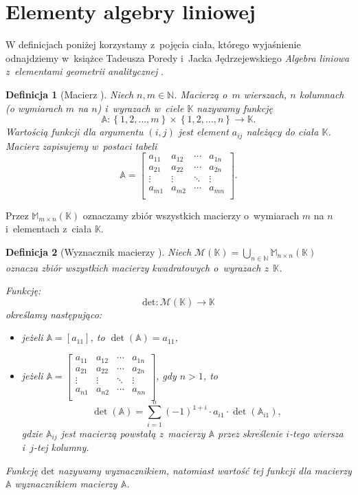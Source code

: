 \documentclass[12pt,a4paper]{report}
\newtheorem{df}{Definicja}[chapter]
\newcommand{\set}[1]{\left\lbrace {#1} \right\rbrace}
\newcommand{\setK}{\mathbb{K}}
\newcommand{\setN}{\mathbb{N}}
\newcommand{\wyznacznik}[1]{\operatorname{det}\left({#1} \right)}
\begin{document}
\section{Elementy algebry liniowej}

W definicjach poniżej korzystamy z~pojęcia ciała, którego wyjaśnienie odnajdziemy w~książce Tadeusza Poredy i~Jacka Jędrzejewskiego \textit{Algebra liniowa z~elementami geometrii analitycznej} {\citep[Sec 4.4]{alzega}}.

\begin{df}[Macierz {\citep[Sec 8.1 Def. 8.1]{alzega}}]
Niech $n,m \in \setN$. Macierzą o~$m$ wierszach, $n$ kolumnach (o wymiarach $m$ na $n$) i~wyrazach w~ciele $\setK$ nazywamy funkcję 
$$
\mathbb{A}: \set{1,2, \ldots ,m}\times \set{1,2, \ldots ,n} \to \setK.
$$
Wartością funkcji dla argumentu $(i,j)$ jest element $a_{ij}$  należący do ciała $\setK$. Macierz zapisujemy w~postaci tabeli
$$
\mathbb{A} = \left[
        \begin{array}{cccc}
         a_{11} & a_{12} & \cdots & a_{1n} \\
         a_{21} & a_{22} & \cdots & a_{2n} \\
         \vdots & \vdots & \ddots & \vdots \\
         a_{m1} & a_{m2} & \cdots & a_{mn} \\
         \end{array}
      \right].
$$
\end{df}
\bigskip
Przez $\mathbb{M}_{m \times n}(\setK)$ oznaczamy zbiór wszystkich macierzy o~wymiarach $m$ na $n$ i~elementach z~ciała $\setK$.

\begin{df}[Wyznacznik macierzy {\citep[Sec 10.1, Def. 10.1]{alzega}}]
Niech $\mathcal{M}(\setK)=\bigcup_{n\in \setN} \mathbb{M}_{n \times n}(\setK)$ oznacza zbiór wszystkich macierzy kwadratowych o~wyrazach z~$\setK$.

Funkcję:
$$
\mathrm{det} : \mathcal{M}(\setK) \to \setK
$$ 
określamy następująco:
\begin{itemize}
\item jeżeli $\mathbb{A}=[a_{11}]$, to $\wyznacznik{\mathbb{A}}=a_{11}$,
\item jeżeli $\mathbb{A} = \left[
        \begin{array}{cccc}
         a_{11} & a_{12} & \cdots & a_{1n} \\
         a_{21} & a_{22} & \cdots & a_{2n} \\
         \vdots & \vdots & \ddots & \vdots \\
         a_{n1} & a_{n2} & \cdots & a_{nn} \\
         \end{array}
      \right]$, gdy $n>1$, to
$$
\wyznacznik{\mathbb{A}} = \sum_{i=1}^n (-1)^{1+i} \cdot a_{i1} \cdot \wyznacznik{\mathbb{A}_{i1}},
$$
gdzie 
$\mathbb{A}_{ij}$ jest macierzą powstałą z~macierzy $\mathbb{A}$ przez skreślenie $i$-tego wiersza i~$j$-tej kolumny.
\end{itemize}
Funkcję $\mathrm{det}$ nazywamy wyznacznikiem, natomiast wartość tej funkcji dla macierzy $\mathbb{A}$ wyznacznikiem macierzy $\mathbb{A}$.
\end{df}
\end{document}
